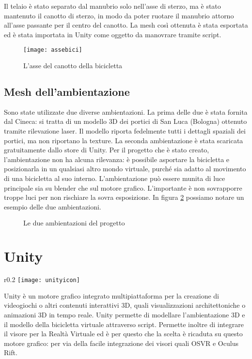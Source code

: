 \noindent Il telaio è stato separato dal manubrio solo nell'asse di sterzo, ma è stato mantenuto il canotto di sterzo, in modo da poter ruotare il manubrio attorno all'asse passante per il centro del canotto. La mesh così ottenuta è stata esportata ed è stata importata in Unity come oggetto da manovrare tramite script.
 \begin{figure}[htb]
    \centering
    \texttt{[image: assebici]}
    \caption{L'asse del canotto della bicicletta\label{fig:assebici}}
\end{figure}

\subsection{Mesh dell'ambientazione}
\label{ambientazione}
\noindent Sono state utilizzate due diverse ambientazioni. La prima delle due è stata fornita dal Cineca: si tratta di un modello 3D dei portici di San Luca (Bologna) ottenuto tramite rilevazione laser. Il modello riporta fedelmente tutti i dettagli spaziali dei portici, ma non riportano la texture. La seconda ambientazione è stata scaricata gratuitamente dallo store di Unity. Per il progetto che è stato creato, l'ambientazione non ha alcuna rilevanza: è possibile asportare la bicicletta e posizionarla in un qualsiasi altro mondo virtuale, purché sia adatto al movimento di una bicicletta al suo interno. L'ambientazione può essere munita di luce principale sia su blender che sul motore grafico. L'importante è non sovrapporre troppe luci per non rischiare la sovra esposizione. In figura \ref{ambientazione} possiamo notare un esempio delle due ambientazioni.
\vspace{1cm}
\begin{figure}[hbp]%
    \centering
    \caption{Le due ambientazioni del progetto}%
    \label{ambientazione}
\end{figure}
\vspace{-0.5cm}
\newpage
\section{Unity}
\noindent 
\begin{wrapfigure}{r}{0.2\textwidth} %
    \centering
    \vspace{-1.3cm}
    \texttt{[image: unityicon]}
    \vspace{-1.3cm}
\end{wrapfigure}
Unity è un motore grafico integrato multipiattaforma per la creazione di videogiochi o altri contenuti interattivi 3D, quali visualizzazioni architettoniche o animazioni 3D in tempo reale. Unity permette di modellare l'ambientazione 3D e il modello della bicicletta virtuale attraverso script. Permette inoltre di integrare il visore per la Realtà Virtuale ed è per questo che la scelta è ricaduta su questo motore grafico: per via della facile integrazione dei visori quali OSVR e Oculus Rift.


